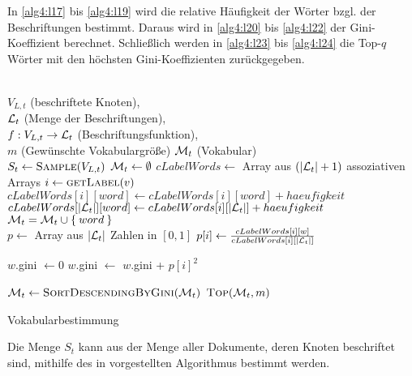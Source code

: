 In \cref{alg4:l17} bis \ref{alg4:l19} wird die relative Häufigkeit
der Wörter bzgl. der Beschriftungen bestimmt. Daraus wird in
\cref{alg4:l20} bis \ref{alg4:l22} der Gini-Koeffizient berechnet.
Schließlich werden in \cref{alg4:l23} bis \ref{alg4:l24} die Top-$q$
Wörter mit den höchsten Gini-Koeffizienten zurückgegeben.

\begin{algorithm}[ht]
    \begin{algorithmic}[1]
        \Require \\
                 $V_{L,t}$ (beschriftete Knoten),\\
                 $\mathcal{L}_t$ (Menge der Beschriftungen),\\
                 $f:V_{L,t} \rightarrow \mathcal{L}_t$ (Beschriftungsfunktion),\\
                 $m$ (Gewünschte Vokabulargröße)
        \Ensure  $\mathcal{M}_t$ (Vokabular)\\
        \State $S_t \gets \Call{Sample}{V_{L,t}}$\label{alg4:l6} 
        \State $\mathcal{M}_t \gets \emptyset$ 
        \State $cLabelWords \gets$ Array aus $(|\mathcal{L}_t|+1)$ assoziativen Arrays\label{alg4:l8}
         \label{alg4:l10}
            \State $i \gets \Call{getLabel}{v}$
                \State $cLabelWords[i][word] \gets cLabelWords[i][word] + haeufigkeit$
                \State $cLabelWords[|\mathcal{L}_t|][word] \gets cLabelWords[i][|\mathcal{L}_t|] + haeufigkeit$
                \State $\mathcal{M}_t = \mathcal{M}_t \cup \Set{word}$
            \EndFor
        \EndFor\label{alg4:l12}
		\\
            \State $p \gets $ Array aus $|\mathcal{L}_t|$ Zahlen in $[0, 1]$\label{alg4:l17}
                \State $p[i] \gets \frac{cLabelWords[i][w]}{cLabelWords[i][|\mathcal{L}_t|]}$
            \EndFor\label{alg4:l19}

            \State $w$.gini $\gets 0$ \label{alg4:l20}
                \State $w$.gini $\gets$ $w$.gini + $p[i]^2$
            \EndFor\label{alg4:l22}
        \EndFor

        \State $\M_t \gets \Call{SortDescendingByGini}{\M_t}$\label{alg4:l23}
        \State \Return $\Call{Top}{\M_t, m}$\label{alg4:l24}
    \end{algorithmic}
\caption{Vokabularbestimmung}
\label{alg:vokabularbestimmung}
\end{algorithm}

Die Menge $S_t$ kann aus der Menge aller Dokumente, deren
Knoten beschriftet sind, mithilfe des in \cite{Vitter} vorgestellten
Algorithmus bestimmt werden.
